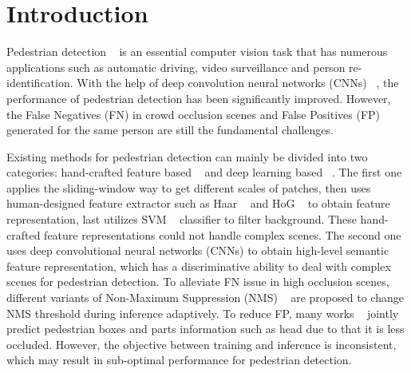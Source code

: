 \documentclass[sigconf]{acmart}
\begin{document}




\maketitle

\section{Introduction}

Pedestrian detection ~\cite{dollar2009pedestrian} is an essential computer vision task that has numerous applications such as automatic driving, video surveillance and person re-identification. With the help of deep convolution neural networks (CNNs) ~\cite{zhang2015filtered, he2016deep, simonyan2014very}, the performance of pedestrian detection has been significantly improved. However, the False Negatives (FN) in crowd occlusion scenes and False Positives (FP) generated for the same person are still the fundamental challenges.

Existing methods for pedestrian detection can mainly be divided into two categories: hand-crafted feature based ~\cite{felzenszwalb2009object,felzenszwalb2010cascade,xu2014domain,yan2014fastest, dollar2009integral,dollar2014fast,nam2014local,zhang2015filtered} and deep learning based ~\cite{zhang2016faster,cai2016unified,brazil2017illuminating,du2017fused,ren2017accurate,mao2017can,wang2018repulsion,liu2018learning}. The first one applies the sliding-window way to get different scales of patches, then uses human-designed feature extractor such as Haar ~\cite{viola2001rapid} and HoG ~\cite{dalal2005histograms} to obtain feature representation, last utilizes SVM ~\cite{cortes1995support} classifier to filter background. These hand-crafted feature representations could not handle complex scenes. The second one uses deep convolutional neural networks (CNNs) to obtain high-level semantic feature representation, which has a discriminative ability to deal with complex scenes for pedestrian detection. To alleviate 
FN issue in high occlusion scenes, different variants of Non-Maximum Suppression (NMS) ~\cite{liu2019adaptive,huang2020nms, bodla2017soft} are proposed to change NMS threshold during inference adaptively. To reduce FP, many works ~\cite{chi2019relational,chi2020pedhunter} jointly predict pedestrian boxes and parts information such as head due to that it is less occluded. However, the objective between training and inference is inconsistent, which may result in sub-optimal performance for pedestrian detection. 
\end{document}
